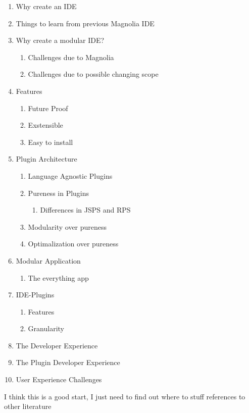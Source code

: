 \begin{enumerate}
  \item Why create an IDE
  \item Things to learn from previous Magnolia IDE
  \item Why create a modular IDE?
  \begin{enumerate}
    \item Challenges due to Magnolia
    \item Challenges due to possible changing scope
  \end{enumerate}
  \item Features
  \begin{enumerate}
    \item Future Proof
    \item Exstensible
    \item Easy to install
  \end{enumerate}
  \item Plugin Architecture
  \begin{enumerate}
    \item Language Agnostic Plugins
    \item Pureness in Plugins
    \begin{enumerate}
      \item Differences in JSPS and RPS
    \end{enumerate}
    \item Modularity over pureness
    \item Optimalization over pureness
  \end{enumerate}
  \item Modular Application
    \begin{enumerate}
      \item The everything app
    \end{enumerate}
  \item IDE-Plugins
    \begin{enumerate}
      \item Features
      \item Granularity
    \end{enumerate}
  \item The Developer Experience
  \item The Plugin Developer Experience
  \item User Experience Challenges
\end{enumerate}

I think this is a good start, I just need to find out where to stuff references
to other literature
